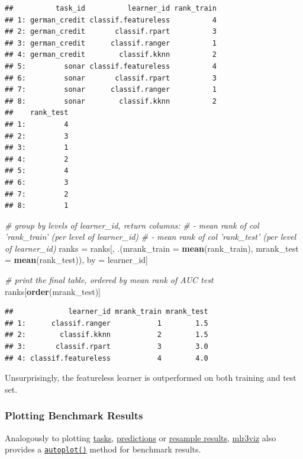 \documentclass[]{article}
\newenvironment{Shaded}{\begin{snugshade}}{\end{snugshade}}
\newcommand{\CommentTok}[1]{\textcolor[rgb]{0.56,0.35,0.01}{\textit{#1}}}
\newcommand{\DataTypeTok}[1]{\textcolor[rgb]{0.13,0.29,0.53}{#1}}
\newcommand{\KeywordTok}[1]{\textcolor[rgb]{0.13,0.29,0.53}{\textbf{#1}}}
\newcommand{\NormalTok}[1]{#1}
\newcommand{\StringTok}[1]{\textcolor[rgb]{0.31,0.60,0.02}{#1}}
\renewenvironment{Shaded} {\begin{snugshade}\small} {\end{snugshade}}
\begin{document}
\begin{verbatim}
##          task_id          learner_id rank_train
## 1: german_credit classif.featureless          4
## 2: german_credit       classif.rpart          3
## 3: german_credit      classif.ranger          1
## 4: german_credit        classif.kknn          2
## 5:         sonar classif.featureless          4
## 6:         sonar       classif.rpart          3
## 7:         sonar      classif.ranger          1
## 8:         sonar        classif.kknn          2
##    rank_test
## 1:         4
## 2:         3
## 3:         1
## 4:         2
## 5:         4
## 6:         3
## 7:         2
## 8:         1
\end{verbatim}

\begin{Shaded}
\begin{Highlighting}[]
\CommentTok{# group by levels of learner_id, return columns:}
\CommentTok{# - mean rank of col 'rank_train' (per level of learner_id)}
\CommentTok{# - mean rank of col 'rank_test' (per level of learner_id)}
\NormalTok{ranks =}\StringTok{ }\NormalTok{ranks[, .(}\DataTypeTok{mrank_train =} \KeywordTok{mean}\NormalTok{(rank_train), }\DataTypeTok{mrank_test =} \KeywordTok{mean}\NormalTok{(rank_test)), by =}\StringTok{ }\NormalTok{learner_id]}

\CommentTok{# print the final table, ordered by mean rank of AUC test}
\NormalTok{ranks[}\KeywordTok{order}\NormalTok{(mrank_test)]}
\end{Highlighting}
\end{Shaded}

\begin{verbatim}
##             learner_id mrank_train mrank_test
## 1:      classif.ranger           1        1.5
## 2:        classif.kknn           2        1.5
## 3:       classif.rpart           3        3.0
## 4: classif.featureless           4        4.0
\end{verbatim}

Unsurprisingly, the featureless learner is outperformed on both training and test set.

\hypertarget{autoplot-benchmarkresult}{%
\subsubsection{Plotting Benchmark Results}\label{autoplot-benchmarkresult}}

Analogously to plotting \protect\hyperlink{autoplot-task}{tasks}, \protect\hyperlink{autoplot-prediction}{predictions} or \protect\hyperlink{autoplot-resampleresult}{resample results}, \href{https://mlr3viz.mlr-org.com}{mlr3viz} also provides a \href{https://www.rdocumentation.org/packages/ggplot2/topics/autoplot}{\texttt{autoplot()}} method for benchmark results.
\end{document}
